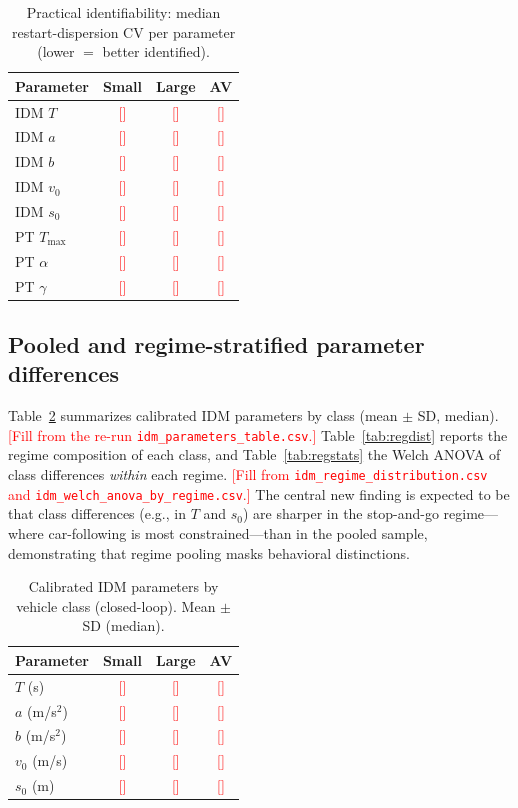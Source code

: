 \documentclass[11pt]{article}
\newcommand{\tbd}[1]{\textcolor{red}{[#1]}}        %
\begin{document}
\begin{table}[t]
\centering
\caption{Practical identifiability: median restart-dispersion CV per parameter
(lower $=$ better identified).}
\label{tab:ident}
\begin{tabular}{lccc}
\toprule
Parameter & Small & Large & AV \\
\midrule
IDM $T$  & \tbd{} & \tbd{} & \tbd{}\\
IDM $a$  & \tbd{} & \tbd{} & \tbd{}\\
IDM $b$  & \tbd{} & \tbd{} & \tbd{}\\
IDM $v_0$& \tbd{} & \tbd{} & \tbd{}\\
IDM $s_0$& \tbd{} & \tbd{} & \tbd{}\\
PT $T_{\max}$ & \tbd{} & \tbd{} & \tbd{}\\
PT $\alpha$   & \tbd{} & \tbd{} & \tbd{}\\
PT $\gamma$   & \tbd{} & \tbd{} & \tbd{}\\
\bottomrule
\end{tabular}
\end{table}

\subsection{Pooled and regime-stratified parameter differences}
Table~\ref{tab:params} summarizes calibrated IDM parameters by class (mean $\pm$
SD, median). \tbd{Fill from the re-run \texttt{idm\_parameters\_table.csv}.}
Table~\ref{tab:regdist} reports the regime composition of each class, and
Table~\ref{tab:regstats} the Welch ANOVA of class differences \emph{within} each
regime. \tbd{Fill from \texttt{idm\_regime\_distribution.csv} and
\texttt{idm\_welch\_anova\_by\_regime.csv}.} The central new finding is expected
to be that class differences (e.g., in $T$ and $s_0$) are sharper in the
stop-and-go regime---where car-following is most constrained---than in the pooled
sample, demonstrating that regime pooling masks behavioral distinctions.

\begin{table}[t]
\centering
\caption{Calibrated IDM parameters by vehicle class (closed-loop). Mean $\pm$ SD
(median).}
\label{tab:params}
\begin{tabular}{lccc}
\toprule
Parameter & Small & Large & AV \\
\midrule
$T$ (s)   & \tbd{} & \tbd{} & \tbd{}\\
$a$ (m/s$^2$) & \tbd{} & \tbd{} & \tbd{}\\
$b$ (m/s$^2$) & \tbd{} & \tbd{} & \tbd{}\\
$v_0$ (m/s)   & \tbd{} & \tbd{} & \tbd{}\\
$s_0$ (m)     & \tbd{} & \tbd{} & \tbd{}\\
\bottomrule
\end{tabular}
\end{table}
\end{document}
